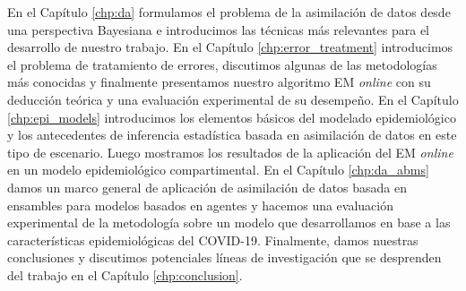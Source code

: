 En el Capítulo \ref{chp:da} formulamos el problema de la asimilación de datos desde una perspectiva Bayesiana e introducimos las técnicas más relevantes para el desarrollo de nuestro trabajo. En el Capítulo \ref{chp:error_treatment} introducimos el problema de tratamiento de errores, discutimos algunas de las metodologías más conocidas y finalmente presentamos nuestro algoritmo EM \textit{online} con su deducción teórica y una evaluación experimental de su desempeño. En el Capítulo \ref{chp:epi_models} introducimos los elementos básicos del modelado epidemiológico y los antecedentes de inferencia estadística basada en asimilación de datos en este tipo de escenario. Luego mostramos los resultados de la aplicación del EM \textit{online} en un modelo epidemiológico compartimental. En el Capítulo \ref{chp:da_abms} damos un marco general de aplicación de asimilación de datos basada en ensambles para modelos basados en agentes y hacemos una evaluación experimental de la metodología sobre un modelo que desarrollamos en base a las características epidemiológicas del COVID-19. Finalmente, damos nuestras conclusiones y discutimos potenciales líneas de investigación que se desprenden del trabajo en el Capítulo \ref{chp:conclusion}.
